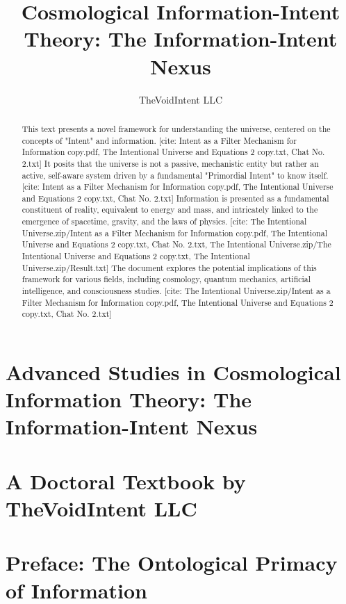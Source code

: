 \documentclass[12pt]{article}
\title{Cosmological Information-Intent Theory: The Information-Intent Nexus}
\author{TheVoidIntent LLC}
\date{}
\begin{document}
\maketitle

\begin{abstract}
This text presents a novel framework for understanding the universe, centered on the concepts of "Intent" and information.
[cite: Intent as a Filter Mechanism for Information copy.pdf, The Intentional Universe and Equations 2 copy.txt, Chat No. 2.txt] It posits that the universe is not a passive, mechanistic entity but rather an active, self-aware system driven by a fundamental "Primordial Intent" to know itself.
[cite: Intent as a Filter Mechanism for Information copy.pdf, The Intentional Universe and Equations 2 copy.txt, Chat No. 2.txt] Information is presented as a fundamental constituent of reality, equivalent to energy and mass, and intricately linked to the emergence of spacetime, gravity, and the laws of physics.
[cite: The Intentional Universe.zip/Intent as a Filter Mechanism for Information copy.pdf, The Intentional Universe and Equations 2 copy.txt, Chat No. 2.txt, The Intentional Universe.zip/The Intentional Universe and Equations 2 copy.txt, The Intentional Universe.zip/Result.txt] The document explores the potential implications of this framework for various fields, including cosmology, quantum mechanics, artificial intelligence, and consciousness studies.
[cite: The Intentional Universe.zip/Intent as a Filter Mechanism for Information copy.pdf, The Intentional Universe and Equations 2 copy.txt, Chat No. 2.txt]
\end{abstract}

\section*{Advanced Studies in Cosmological Information Theory: The Information-Intent Nexus}

\section*{A Doctoral Textbook by TheVoidIntent LLC}

\section*{Preface: The Ontological Primacy of Information}
\end{document}
